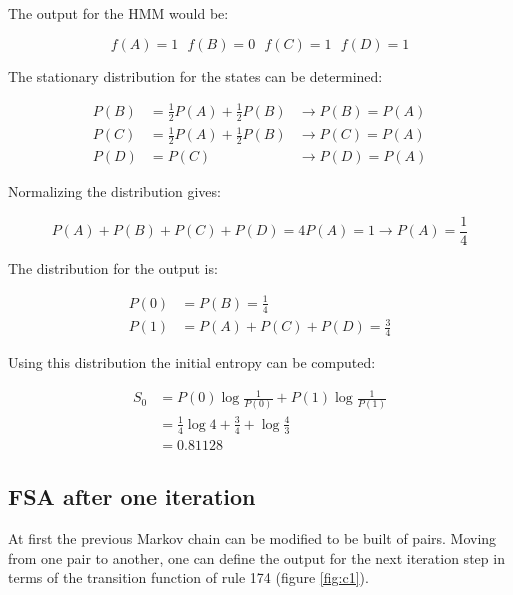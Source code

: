 \documentclass[12pt]{scrartcl}
\begin{document}
The output for the HMM would be:

\begin{equation}
f(A) = 1 \ \ \ f(B) = 0 \ \ \ f(C) = 1 \ \ \ f(D) = 1
\end{equation}

The stationary distribution for the states can be determined:

\begin{equation}\begin{aligned}
P(B) &= \frac{1}{2}P(A) + \frac{1}{2}P(B) &\rightarrow P(B) = P(A)\\
P(C) &= \frac{1}{2}P(A) + \frac{1}{2}P(B) &\rightarrow P(C) = P(A)\\
P(D) &= P(C) &\rightarrow P(D) = P(A)
\end{aligned}\end{equation}

Normalizing the distribution gives:

\begin{equation}
P(A) + P(B) + P(C) + P(D) = 4 P(A) = 1 \rightarrow P(A) = \frac{1}{4}
\end{equation}

The distribution for the output is:

\begin{equation}\begin{aligned}
P(0) &= P(B) = \frac{1}{4}\\
P(1) &= P(A) + P(C) + P(D) = \frac{3}{4}
\end{aligned}\end{equation}

Using this distribution the initial entropy can be computed:

\begin{equation}\begin{aligned}
S_0 &= P(0) \log \frac{1}{P(0)} + P(1) \log \frac{1}{P(1)}\\
&= \frac{1}{4} \log 4 + \frac{3}{4} + \log \frac{4}{3}\\
&= 0.81128
\end{aligned}\end{equation}

\subsection*{FSA after one iteration}

At first the previous Markov chain can be modified to be built of pairs. Moving from one pair to another, one can define the output for the next iteration step in terms of the transition function of rule 174 (figure \ref{fig:c1}).
\end{document}
